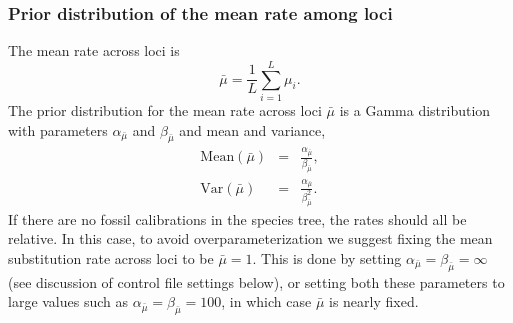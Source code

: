 \documentclass{book}
\numberwithin{equation}{section} \renewcommand{\baselinestretch}{0.55}
\begin{document}
\subsubsection{Prior distribution of the mean rate among loci}
The mean rate across loci is
\begin{displaymath}
  \bar{\mu} = \frac{1}{L} \sum_{i=1}^L \mu_i.
\end{displaymath}
The prior distribution for the mean rate across loci $\bar{\mu}$ is a
Gamma distribution with parameters $\alpha_{\bar{\mu}}$ and
$\beta_{\bar{\mu}}$ and mean and variance,
\begin{eqnarray}
  \textrm{Mean}(\bar{\mu}) & = & \frac{\alpha_{\bar{\mu}}}{\beta_{\bar{\mu}}}, \nonumber \\
  \textrm{Var}(\bar{\mu}) & = & \frac{\alpha_{\bar{\mu}}}{\beta_{\bar{\mu}}^2}. \nonumber
\end{eqnarray}
If there are no fossil calibrations in the species tree, the rates
should all be relative.  In this case, to avoid overparameterization
we suggest fixing the mean substitution rate across loci to be
$\bar\mu = 1$. This is done by setting
$\alpha_{\bar{\mu}} = \beta_{\bar{\mu}} = \infty$ (see discussion of
control file settings below), or setting both these parameters to
large values such as $\alpha_{\bar{\mu}} = \beta_{\bar{\mu}} = 100$,
in which case $\bar{\mu}$ is nearly fixed.
\end{document}
